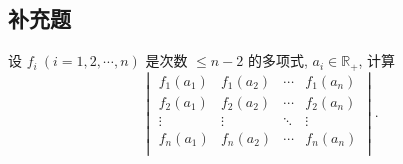 \documentclass{ctexart}
\begin{document}
\subsection{补充题}
\begin{exercisec}%
    设 $f_i\ (i=1,2,\cdots,n)$ 是次数 $\leq n-2$ 的多项式, $a_i\in\mathbb{R}_+$, 计算
    \[\begin{vmatrix}
        f_1(a_1) & f_1(a_2) & \cdots & f_1(a_n) \\
        f_2(a_1) & f_2(a_2) & \cdots & f_2(a_n) \\
        \vdots & \vdots & \ddots & \vdots \\
        f_n(a_1) & f_n(a_2) & \cdots & f_n(a_n) \\
    \end{vmatrix}.\]
\end{exercisec}
\end{document}
